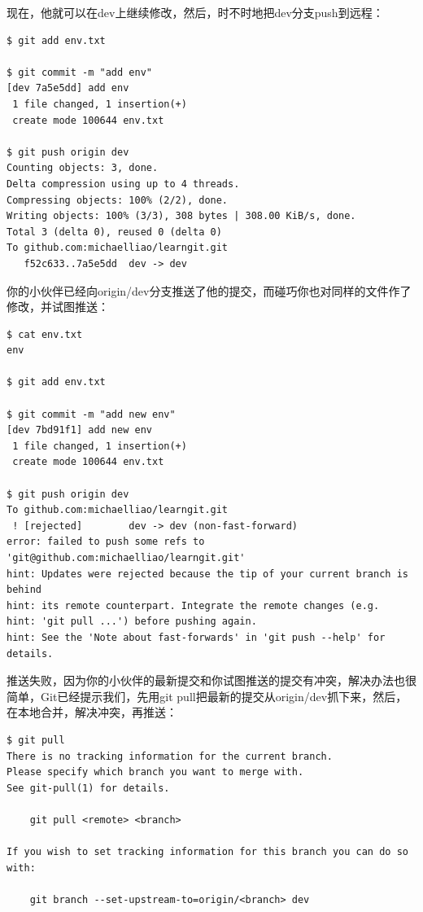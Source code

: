 现在，他就可以在dev上继续修改，然后，时不时地把dev分支push到远程：

\begin{verbatim}
$ git add env.txt

$ git commit -m "add env"
[dev 7a5e5dd] add env
 1 file changed, 1 insertion(+)
 create mode 100644 env.txt

$ git push origin dev
Counting objects: 3, done.
Delta compression using up to 4 threads.
Compressing objects: 100% (2/2), done.
Writing objects: 100% (3/3), 308 bytes | 308.00 KiB/s, done.
Total 3 (delta 0), reused 0 (delta 0)
To github.com:michaelliao/learngit.git
   f52c633..7a5e5dd  dev -> dev
\end{verbatim}

你的小伙伴已经向origin/dev分支推送了他的提交，而碰巧你也对同样的文件作了修改，并试图推送：

\begin{verbatim}
$ cat env.txt
env

$ git add env.txt

$ git commit -m "add new env"
[dev 7bd91f1] add new env
 1 file changed, 1 insertion(+)
 create mode 100644 env.txt

$ git push origin dev
To github.com:michaelliao/learngit.git
 ! [rejected]        dev -> dev (non-fast-forward)
error: failed to push some refs to 'git@github.com:michaelliao/learngit.git'
hint: Updates were rejected because the tip of your current branch is behind
hint: its remote counterpart. Integrate the remote changes (e.g.
hint: 'git pull ...') before pushing again.
hint: See the 'Note about fast-forwards' in 'git push --help' for details.
\end{verbatim}

推送失败，因为你的小伙伴的最新提交和你试图推送的提交有冲突，解决办法也很简单，Git已经提示我们，先用git pull把最新的提交从origin/dev抓下来，然后，在本地合并，解决冲突，再推送：

\begin{verbatim}
$ git pull
There is no tracking information for the current branch.
Please specify which branch you want to merge with.
See git-pull(1) for details.

    git pull <remote> <branch>

If you wish to set tracking information for this branch you can do so with:

    git branch --set-upstream-to=origin/<branch> dev
\end{verbatim}

